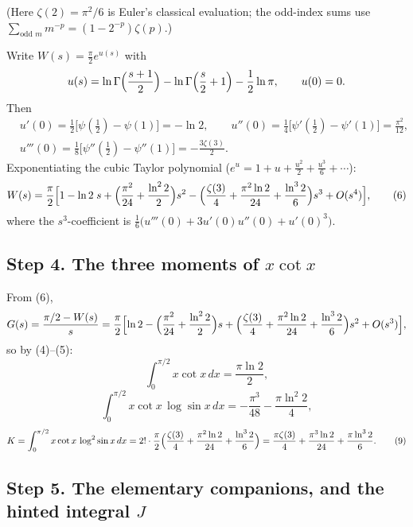 \documentclass[11pt]{article}
\theoremstyle{remark}
\begin{document}
(Here $\zeta(2)=\pi^2/6$ is Euler's classical evaluation; the odd-index sums use $\sum_{\text{odd }m}m^{-p}=(1-2^{-p})\zeta(p)$.)

Write $W(s)=\frac{\pi}{2}e^{u(s)}$ with
$$u(s)=\ln\Gamma\Bigl(\frac{s+1}{2}\Bigr)-\ln\Gamma\Bigl(\frac{s}{2}+1\Bigr)-\frac12\ln\pi,\qquad u(0)=0 .$$
Then
$$\begin{aligned}
&u'(0)=\tfrac12\bigl[\psi(\tfrac12)-\psi(1)\bigr]=-\ln 2,\qquad
u''(0)=\tfrac14\bigl[\psi'(\tfrac12)-\psi'(1)\bigr]=\frac{\pi^{2}}{12},\\
&u'''(0)=\tfrac18\bigl[\psi''(\tfrac12)-\psi''(1)\bigr]=-\frac{3\zeta(3)}{2}.
\end{aligned}$$
Exponentiating the cubic Taylor polynomial ($e^{u}=1+u+\frac{u^{2}}{2}+\frac{u^{3}}{6}+\cdots$):
\begin{equation}W(s)=\frac{\pi}{2}\Bigl[1-\ln 2\;s+\Bigl(\frac{\pi^{2}}{24}+\frac{\ln^{2}2}{2}\Bigr)s^{2}
-\Bigl(\frac{\zeta(3)}{4}+\frac{\pi^{2}\ln 2}{24}+\frac{\ln^{3}2}{6}\Bigr)s^{3}+O(s^{4})\Bigr], \tag{6}\end{equation}
where the $s^3$-coefficient is $\frac{1}{6}\bigl(u'''(0)+3u'(0)u''(0)+u'(0)^{3}\bigr)$.

\subsection*{Step 4. The three moments of $x\cot x$}

From (6),
$$G(s)=\frac{\pi/2-W(s)}{s}
=\frac{\pi}{2}\Bigl[\ln 2-\Bigl(\frac{\pi^{2}}{24}+\frac{\ln^{2}2}{2}\Bigr)s
+\Bigl(\frac{\zeta(3)}{4}+\frac{\pi^{2}\ln 2}{24}+\frac{\ln^{3}2}{6}\Bigr)s^{2}+O(s^{3})\Bigr],$$
so by (4)--(5):
\begin{equation}\int_0^{\pi/2}x\cot x\,dx=\frac{\pi\ln 2}{2}, \tag{7}\end{equation}
\begin{equation}\int_0^{\pi/2}x\cot x\,\log\sin x\,dx=-\frac{\pi^{3}}{48}-\frac{\pi\ln^{2}2}{4}, \tag{8}\end{equation}
\begin{equation}K=\int_0^{\pi/2}x\cot x\,\log^{2}\sin x\,dx
=2!\cdot\frac{\pi}{2}\Bigl(\frac{\zeta(3)}{4}+\frac{\pi^{2}\ln 2}{24}+\frac{\ln^{3}2}{6}\Bigr)
=\frac{\pi\zeta(3)}{4}+\frac{\pi^{3}\ln 2}{24}+\frac{\pi\ln^{3}2}{6}. \tag{9}\end{equation}

\subsection*{Step 5. The elementary companions, and the hinted integral $J$}
\end{document}
